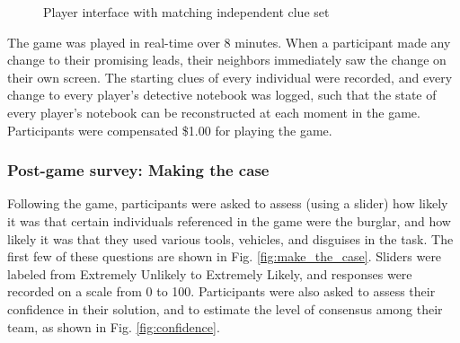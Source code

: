 \documentclass{article}
\begin{document}
\begin{figure}[h!]
\centering
{}
\caption{Player interface with matching independent clue set}
\label{fig:independent_game}
\end{figure}

The game was played in real-time over 8 minutes. When a participant made any change to their promising leads, their neighbors immediately saw the change on their own screen. The starting clues of every individual were recorded, and every change to every player’s detective notebook was logged, such that the state of every player’s notebook can be reconstructed at each moment in the game. Participants were compensated \$1.00 for playing the game.

\subsubsection{Post-game survey: Making the case}

Following the game, participants were asked to assess (using a slider) how likely it was that certain individuals referenced in the game were the burglar, and how likely it was that they used various tools, vehicles, and disguises in the task. The first few of these questions are shown in Fig. \ref{fig:make_the_case}. Sliders were labeled from Extremely Unlikely to Extremely Likely, and responses were recorded on a scale from 0 to 100. Participants were also asked to assess their confidence in their solution, and to estimate the level of consensus among their team, as shown in Fig. \ref{fig:confidence}.
\end{document}
